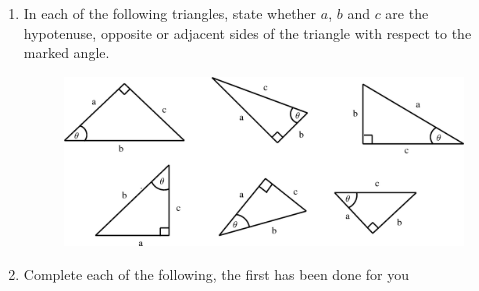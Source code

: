       \label{m39408*id80155}\begin{enumerate}[noitemsep, label=\textbf{\arabic*}. ] 
            \label{m39408*uid22}\item In each of the following triangles, state whether \begin{math}a\end{math}, \begin{math}b\end{math} and \begin{math}c\end{math} are the hypotenuse, opposite or adjacent sides of the triangle with respect to the marked angle.

    \setcounter{subfigure}{0}


	\begin{figure}[H] %
    \begin{center}
    \label{m39408*id80200!!!underscore!!!media}\label{m39408*id80200!!!underscore!!!printimage}\includegraphics{col11306.imgs/m39408_MG10C15_004.png} %
        
      \vspace{2pt}
    \vspace{.1in}
    
    \end{center}

 \end{figure}   

    \addtocounter{footnote}{-0}
    \label{m39408*uid23}\item Complete each of the following, the first has been done for you

    \setcounter{subfigure}{0}



\end{enumerate}
